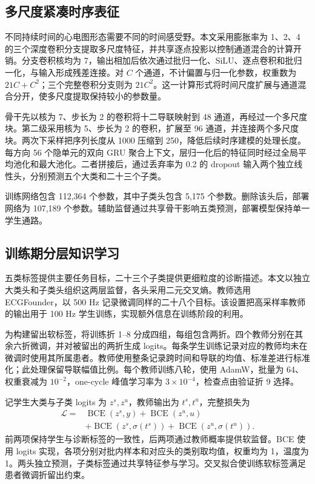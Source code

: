 \documentclass[11pt,a4paper,UTF8,fontset=windows]{ctexart}
\begin{document}
\subsection{多尺度紧凑时序表征}
不同持续时间的心电图形态需要不同的时间感受野。本文采用膨胀率为 1、2、4 的三个深度卷积分支提取多尺度特征，并共享逐点投影以控制通道混合的计算开销\cite{howard2017}。分支卷积核均为 7，输出相加后依次通过批归一化、SiLU、逐点卷积和批归一化，与输入形成残差连接。对 $C$ 个通道，不计偏置与归一化参数，权重数为 $21C+C^2$；三个完整卷积分支则为 $21C^2$。这一计算形式将时间尺度扩展与通道混合分开，使多尺度提取保持较小的参数量。

骨干先以核为 7、步长为 2 的卷积将十二导联映射到 48 通道，再经过一个多尺度块。第二级采用核为 5、步长为 2 的卷积，扩展至 96 通道，并连接两个多尺度块。两次下采样把序列长度从 1000 压缩到 250，降低后续时序建模的处理长度。每方向 56 个隐单元的双向 GRU\cite{cho2014} 聚合上下文，层归一化后的特征同时经过全局平均池化和最大池化。二者拼接后，通过丢弃率为 0.2 的 dropout 输入两个独立线性头，分别预测五个大类和二十三个子类。

训练网络包含 112,364 个参数，其中子类头包含 5,175 个参数。删除该头后，部署网络为 107,189 个参数。辅助监督通过共享骨干影响五类预测，部署模型保持单一学生通路。

\subsection{训练期分层知识学习}
五类标签提供主要任务目标，二十三个子类提供更细粒度的诊断描述。本文以独立大类头和子类头组织这两层监督，各头采用二元交叉熵。教师选用 ECGFounder\cite{li2025}，以 500 Hz 记录微调同样的二十八个目标。该设置把高采样率教师的输出用于 100 Hz 学生训练，实现额外信息在训练阶段的利用。

为构建留出软标签，将训练折 1--8 分成四组，每组包含两折。四个教师分别在其余六折微调，并对被留出的两折生成 logits。每条学生训练记录对应的教师均未在微调时使用其所属患者。教师使用整条记录跨时间和导联的均值、标准差进行标准化；此处理保留导联幅值比例。每个教师训练八轮，使用 AdamW，批量为 64、权重衰减为 $10^{-2}$，one-cycle 峰值学习率为 $3\times10^{-4}$，检查点由验证折 9 选择。

记学生大类与子类 logits 为 $z^s,z^u$，教师输出为 $t^s,t^u$，完整损失为
\begin{align}
 \mathcal L={}&\operatorname{BCE}(z^s,y)+\operatorname{BCE}(z^u,u)\nonumber\\
 &+\operatorname{BCE}(z^s,\sigma(t^s))+\operatorname{BCE}(z^u,\sigma(t^u)).
\end{align}
前两项保持学生与诊断标签的一致性，后两项通过教师概率提供软监督\cite{hinton2015}。BCE 使用 logits 实现，各项分别对批内样本和对应头的类别取均值，权重均为 1，温度为 1。两头独立预测，子类标签通过共享特征参与学习。交叉拟合使训练软标签满足患者微调折留出约束。
\end{document}
